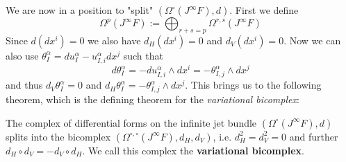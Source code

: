 We are now in a position to "split" $(\Omega^\circ(J^\infty F), d)$. First we define
$$ \Omega^p (J^\infty F) := \bigoplus_{r+s=p} \Omega^{r,s}(J^\infty F) $$
Since $d(dx^i)=0$ we also have $d_H(dx^i) = 0$ and $d_V(dx^i) = 0$. Now we can also use $\theta^\alpha_I = du^\alpha_I - u^\alpha_{I,i} dx^j$ such that
$$ d \theta^\alpha_I = -d u^\alpha_{I,i} \wedge dx^i = - \theta^\alpha_{I,j} \wedge dx^j $$
and thus $d_V \theta^\alpha_I = 0$ and $d_H \theta^\alpha_I = - \theta^\alpha_{I,j} \wedge dx^j$. This brings us to the following theorem, which is the defining theorem for the \emph{variational bicomplex}:

\begin{theo}
  The complex of differential forms on the infinite jet bundle $(\Omega^\circ(J^\infty F), d)$ splits into the bicomplex $(\Omega^{\circ, \circ}(J^\infty F), d_H, d_V)$, i.e. $d^2_H = d_V^2 = 0$ and further $d_H \circ d_V = -d_V \circ d_H$. We call this complex the \textbf{variational bicomplex}.
\end{theo}



\newpage
